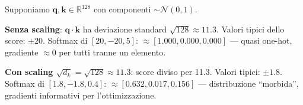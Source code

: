 \documentclass[12pt,a4paper]{article}
\begin{document}
\begin{examplebox}[Effetto dello scaling: esempio con $d_k = 128$]
Supponiamo $\mathbf{q}, \mathbf{k} \in \mathbb{R}^{128}$ con componenti $\sim \mathcal{N}(0, 1)$.

\textbf{Senza scaling}: $\mathbf{q} \cdot \mathbf{k}$ ha deviazione standard $\sqrt{128} \approx 11.3$. Valori tipici dello score: $\pm 20$. Softmax di $[20, -20, 5]$: $\approx [1.000, 0.000, 0.000]$ --- quasi one-hot, gradiente $\approx 0$ per tutti tranne un elemento.

\textbf{Con scaling $\sqrt{d_k} = \sqrt{128} \approx 11.3$}: score diviso per 11.3. Valori tipici: $\pm 1.8$. Softmax di $[1.8, -1.8, 0.4]$: $\approx [0.632, 0.017, 0.156]$ --- distribuzione ``morbida'', gradienti informativi per l'ottimizzazione.
\end{examplebox}
\end{document}
